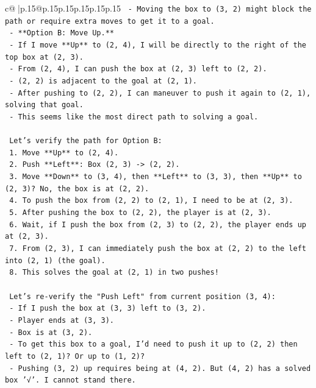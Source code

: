 \documentclass{article}
\begin{document}
{\begin{supertabular}{c@{$\;$}|p{.15\linewidth}@{}p{.15\linewidth}p{.15\linewidth}p{.15\linewidth}p{.15\linewidth}p{.15\linewidth}}
{{{\texttt{        {-} Moving the box to (3, 2) might block the path or require extra moves to get it to a goal.} \\
\texttt{    {-} **Option B: Move Up.**} \\
\texttt{        {-} If I move **Up** to (2, 4), I will be directly to the right of the top box at (2, 3).} \\
\texttt{        {-} From (2, 4), I can push the box at (2, 3) left to (2, 2).} \\
\texttt{        {-} (2, 2) is adjacent to the goal at (2, 1).} \\
\texttt{        {-} After pushing to (2, 2), I can maneuver to push it again to (2, 1), solving that goal.} \\
\texttt{        {-} This seems like the most direct path to solving a goal.} \\
\\ 
\texttt{    Let's verify the path for Option B:} \\
\texttt{    1. Move **Up** to (2, 4).} \\
\texttt{    2. Push **Left**: Box (2, 3) {-}> (2, 2).} \\
\texttt{    3. Move **Down** to (3, 4), then **Left** to (3, 3), then **Up** to (2, 3)? No, the box is at (2, 2).} \\
\texttt{    4. To push the box from (2, 2) to (2, 1), I need to be at (2, 3).} \\
\texttt{    5. After pushing the box to (2, 2), the player is at (2, 3).} \\
\texttt{    6. Wait, if I push the box from (2, 3) to (2, 2), the player ends up at (2, 3).} \\
\texttt{    7. From (2, 3), I can immediately push the box at (2, 2) to the left into (2, 1) (the goal).} \\
\texttt{    8. This solves the goal at (2, 1) in two pushes!} \\
\\ 
\texttt{    Let's re{-}verify the "Push Left" from current position (3, 4):} \\
\texttt{    {-} If I push the box at (3, 3) left to (3, 2).} \\
\texttt{    {-} Player ends at (3, 3).} \\
\texttt{    {-} Box is at (3, 2).} \\
\texttt{    {-} To get this box to a goal, I'd need to push it up to (2, 2) then left to (2, 1)? Or up to (1, 2)?} \\
\texttt{    {-} Pushing (3, 2) up requires being at (4, 2). But (4, 2) has a solved box '√'. I cannot stand there.} \\
}}}
\end{supertabular}}
\end{document}
